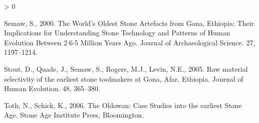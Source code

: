\documentclass[]{elsarticle} %
\newlength{\cslhangindent}
\newenvironment{CSLReferences}[2] %
 {%
  \setlength{\parindent}{0pt}
  \ifodd #1 \everypar{\setlength{\hangindent}{\cslhangindent}}\ignorespaces\fi
  \ifnum #2 > 0
  \setlength{\parskip}{#2\baselineskip}
  \fi
 }%
 {}
\begin{document}
\begin{CSLReferences}{1}{0}
\leavevmode\hypertarget{ref-semawWorldOldestStone2000}{}%
Semaw, S., 2000. The {World}'s {Oldest Stone Artefacts} from {Gona},
{Ethiopia}: {Their Implications} for {Understanding Stone Technology}
and {Patterns} of {Human Evolution Between} 2{\(\cdot\)}6{\(\cdot\)}5
{Million Years Ago}. Journal of Archaeological Science. 27, 1197--1214.

\leavevmode\hypertarget{ref-stoutRawMaterialSelectivity2005}{}%
Stout, D., Quade, J., Semaw, S., Rogers, M.J., Levin, N.E., 2005. Raw
material selectivity of the earliest stone toolmakers at {Gona}, {Afar},
{Ethiopia}. Journal of Human Evolution. 48, 365--380.

\leavevmode\hypertarget{ref-tothOldowanCaseStudies2006}{}%
Toth, N., Schick, K., 2006. The {Oldowan}: {Case Studies} into the
earliest {Stone Age}. {Stone Age Institute Press}, {Bloomington}.

\end{CSLReferences}
\end{document}
